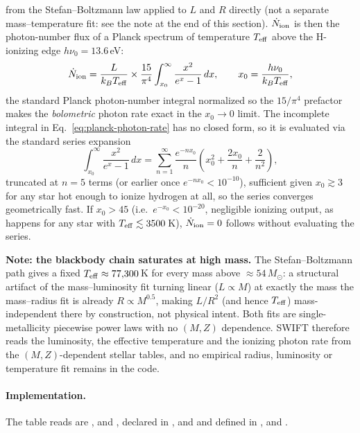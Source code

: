 from the Stefan--Boltzmann law applied to $L$ and $R$ directly (not a
separate mass--temperature fit: see the note at the end of this
section). $\dot N_{\rm ion}$ is then the photon-number flux of a
Planck spectrum of temperature $T_{\rm eff}$ above the H-ionizing edge
$h\nu_0=13.6\,$eV:
\begin{equation}
  \dot N_{\rm ion} = \frac{L}{k_B T_{\rm eff}} \times
  \frac{15}{\pi^4} \int_{x_0}^{\infty} \frac{x^2}{e^x-1}\,dx, \qquad
  x_0 = \frac{h\nu_0}{k_B T_{\rm eff}},
  \label{eq:planck-photon-rate}
\end{equation}
the standard Planck photon-number integral normalized so the
$15/\pi^4$ prefactor makes the \emph{bolometric} photon rate exact in
the $x_0\to0$ limit. The incomplete integral in
Eq.~\ref{eq:planck-photon-rate} has no closed form, so it is
evaluated via the standard series expansion
\begin{equation}
  \int_{x_0}^\infty \frac{x^2}{e^x-1}\,dx =
  \sum_{n=1}^{\infty} \frac{e^{-nx_0}}{n}
  \left(x_0^2 + \frac{2x_0}{n} + \frac{2}{n^2}\right),
  \label{eq:planck-series}
\end{equation}
truncated at $n=5$ terms (or earlier once $e^{-nx_0}<10^{-10}$),
sufficient given $x_0 \gtrsim 3$ for any star hot enough to ionize
hydrogen at all, so the series converges geometrically fast. If
$x_0 > 45$ (i.e.\ $e^{-x_0}<10^{-20}$, negligible ionizing output, as
happens for any star with $T_{\rm eff}\lesssim3500\,$K), $\dot N_{\rm
ion}=0$ follows without evaluating the series.

\textbf{Note: the blackbody chain saturates at high mass.}
The Stefan--Boltzmann path gives a fixed $T_{\rm eff}\approx77{,}300\,$K for
every mass above $\approx54\,M_\odot$: a structural artifact of the
mass--luminosity fit turning linear ($L\propto M$) at exactly the mass
the mass--radius fit is already $R\propto M^{0.5}$, making $L/R^2$ (and
hence $T_{\rm eff}$) mass-independent there by construction, not
physical intent. Both fits are single-metallicity piecewise power laws
with no $(M,Z)$ dependence. SWIFT therefore reads the luminosity, the
effective temperature and the ionizing photon rate from the
$(M,Z)$-dependent  stellar tables, and no empirical radius,
luminosity or temperature fit remains in the code.

\paragraph{Implementation.} The table reads are
,
 and
, declared in
,  and  and
defined in ,  and
.
